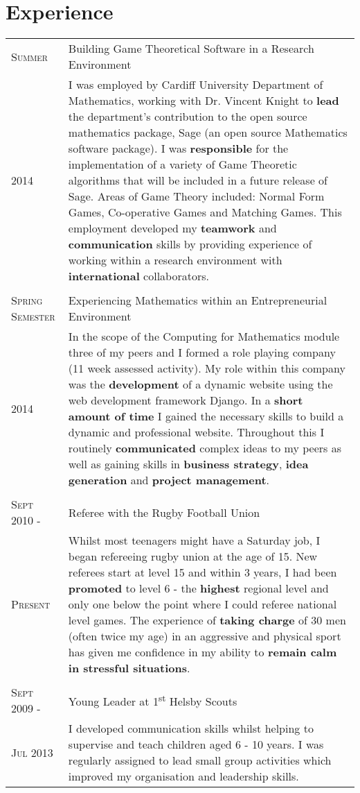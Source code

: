 \documentclass[a4paper]{article}
\begin{document}
\section{Experience}
\begin{tabularx}{\textwidth}{lX}

\textsc{Summer} & Building Game Theoretical Software in a Research Environment \\
\textsc{2014}& \footnotesize{I was employed by Cardiff University Department of Mathematics, working with Dr. Vincent Knight to \textbf{lead} the department's contribution to the open source mathematics package, Sage (an open source Mathematics software package).
I was \textbf{responsible} for the implementation of a variety of Game Theoretic algorithms that will be included in a future release of Sage.
Areas of Game Theory included: Normal Form Games, Co-operative Games and Matching Games.
This employment developed my \textbf{teamwork} and \textbf{communication} skills by providing experience of working within a research environment with \textbf{international} collaborators.}\\
\\

\textsc{Spring Semester} & Experiencing Mathematics within an Entrepreneurial Environment\\
\textsc{2014}& \footnotesize{In the scope of the Computing for Mathematics module three of my peers and I formed a role playing company (11 week assessed activity).
My role within this company was the \textbf{development} of a dynamic website using the web development framework Django.
In a \textbf{short amount of time} I gained the necessary skills to build a dynamic and professional website.
Throughout this I routinely \textbf{communicated} complex ideas to my peers as well as gaining skills in \textbf{business strategy}, \textbf{idea generation} and \textbf{project management}.
}\\
\\
\textsc{Sept 2010 -} & Referee with the Rugby Football Union \\
\textsc{Present} & \footnotesize{Whilst most teenagers might have a Saturday job, I began refereeing rugby union at the age of 15.
New referees start at level 15 and within 3 years, I had been \textbf{promoted} to level 6 - the \textbf{highest} regional level and only one below the point where I could referee national level games.
The experience of \textbf{taking charge} of 30 men (often twice my age) in an aggressive and physical sport has given me confidence in my ability to \textbf{remain calm in stressful situations}.}\\
\\
\textsc{Sept 2009 -} & Young Leader at 1\textsuperscript{st} Helsby Scouts\\
\textsc{Jul 2013}& \footnotesize{I developed communication skills whilst helping to supervise and teach children aged 6 - 10 years.
I was regularly assigned to lead small group activities which improved my organisation and leadership skills.}\\

\end{tabularx}
\end{document}

